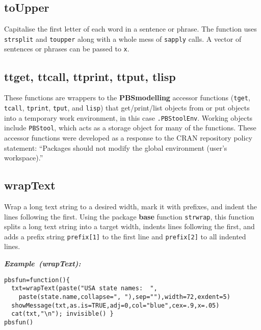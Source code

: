 \documentclass[letterpaper,12pt,fleqn]{article}
\def\tab{\hspace{0.5 in}}
\newcommand{\code}[1]{\small\texttt{#1}\normalsize}
\newcommand{\pkg}[1]{{\bf #1}}
\newcommand{\dQuote}[1]{``#1''}
\newcommand\example[1]{    %
	\textbf{\emph{Example~(#1):}}\\ \vspace{3 pt}
}
\begin{document}
\subsection {toUpper}

\tab Capitalise the first letter of each word in a sentence or phrase. The function uses \code{strsplit} and \code{toupper} along with a whole mess of \code{sapply} calls. A vector of sentences or phrases can be passed to \code{x}.

\subsection {ttget, ttcall, ttprint, ttput, tlisp}

\tab These functions are wrappers to the \pkg{PBSmodelling} accessor functions (\code{tget}, \code{tcall}, \code{tprint}, \code{tput}, and \code{lisp}) that get/print/list objects from or put objects into a temporary work environment, in this case \code{.PBStoolEnv}. Working objects include \code{PBStool}, which acts as a storage object for many of the functions. These accessor functions were developed as a response to the CRAN repository policy statement: \dQuote{Packages should not modify the global environment (user's workspace).} 

\subsection {wrapText}

\tab Wrap a long text string to a desired width, mark it with prefixes, and indent the lines following the first.  Using the package \pkg{base} function \code{strwrap}, this function splits a long text string into a target width, indents lines following the first, and adds a prefix string \code{prefix[1]} to the first line and \code{prefix[2]} to all indented lines.

\begin{examplebox}
\example{wrapText}
\begin{Verbatim}[fontsize=\footnotesize]
pbsfun=function(){
  txt=wrapText(paste("USA state names:  ",
    paste(state.name,collapse=", "),sep=""),width=72,exdent=5)
  showMessage(txt,as.is=TRUE,adj=0,col="blue",cex=.9,x=.05)
  cat(txt,"\n"); invisible() }
pbsfun()
\end{Verbatim}
\end{examplebox}
\end{document}
